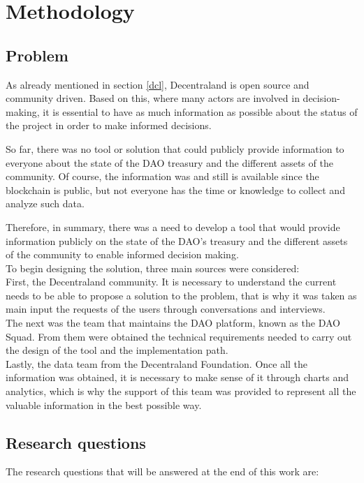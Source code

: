 \documentclass[MSE,Master,english]{twbook}%
\begin{document}
\chapter{Methodology\label{method}}
\section{Problem}
As already mentioned in section \ref{dcl}, Decentraland is open source and community driven. Based on this, where many actors are involved in decision-making, it is essential to have as much information as possible about the status of the project in order to make informed decisions.

So far, there was no tool or solution that could publicly provide information to everyone about the state of the DAO treasury and the different assets of the community. Of course, the information was and still is available since the blockchain is public, but not everyone has the time or knowledge to collect and analyze such data.

Therefore, in summary, there was a need to develop a tool that would provide information publicly on the state of the DAO's treasury and the different assets of the community to enable informed decision making. \\

To begin designing the solution, three main sources were considered: \\

First, the Decentraland community. It is necessary to understand the current needs to be able to propose a solution to the problem, that is why it was taken as main input the requests of the users through conversations and interviews. \\

The next was the team that maintains the DAO platform, known as the DAO Squad. From them were obtained the technical requirements needed to carry out the design of the tool and the implementation path. \\

Lastly, the data team from the Decentraland Foundation. Once all the information was obtained, it is necessary to make sense of it through charts and analytics, which is why the support of this team was provided to represent all the valuable information in the best possible way.

\section{Research questions\label{research}}
The research questions that will be answered at the end of this work are: \\
\end{document}
